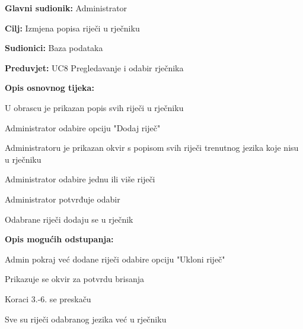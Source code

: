 \noindent {}
\begin{packed_item}

	\item \textbf{Glavni sudionik: } Administrator
	\item \textbf{Cilj: } Izmjena popisa riječi u rječniku
	\item \textbf{Sudionici: } Baza podataka
	\item \textbf{Preduvjet: } UC8 Pregledavanje i odabir rječnika
	\item  \textbf{Opis osnovnog tijeka:}
	
	\item[] \begin{packed_enum}
		
		\item U obrascu je prikazan popis svih riječi u rječniku
		\item Administrator odabire opciju "Dodaj riječ"
		\item Administratoru je prikazan okvir s popisom svih riječi trenutnog jezika koje nisu u rječniku
		\item Administrator odabire jednu ili više riječi
		\item Administrator potvrđuje odabir
		\item Odabrane riječi dodaju se u rječnik

	\end{packed_enum}

	\item  \textbf{Opis mogućih odstupanja:}
	
	\item[] \begin{packed_item}

		\item[2.a] Admin pokraj već dodane riječi odabire opciju "Ukloni riječ"
		\item[] \begin{packed_enum}
			
			\item Prikazuje se okvir za potvrdu brisanja 
			\item Koraci 3.-6. se preskaču
			
		\end{packed_enum}

		\item[3.a] Sve su riječi odabranog jezika već u rječniku
		\item[] \begin{packed_enum}
			

\end{packed_enum}
\end{packed_item}
\end{packed_item}
